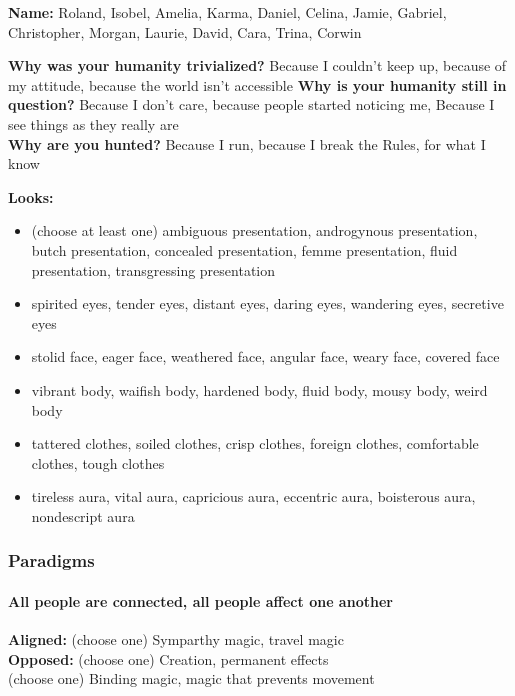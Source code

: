 \documentclass[
]{article}
\providecommand{\tightlist}{%
  \setlength{\itemsep}{0pt}\setlength{\parskip}{0pt}}
\begin{document}
\textbf{Name:} Roland, Isobel, Amelia, Karma, Daniel, Celina, Jamie,
Gabriel, Christopher, Morgan, Laurie, David, Cara, Trina, Corwin

\textbf{Why was your humanity trivialized?} Because I couldn't keep up,
because of my attitude, because the world isn't accessible \textbf{Why
is your humanity still in question?} Because I don't care, because
people started noticing me, Because I see things as they really are\\
\textbf{Why are you hunted?} Because I run, because I break the Rules,
for what I know

\textbf{Looks:}

\begin{itemize}
\tightlist
\item
  (choose at least one) ambiguous presentation, androgynous
  presentation, butch presentation, concealed presentation, femme
  presentation, fluid presentation, transgressing presentation
\item
  spirited eyes, tender eyes, distant eyes, daring eyes, wandering eyes,
  secretive eyes
\item
  stolid face, eager face, weathered face, angular face, weary face,
  covered face
\item
  vibrant body, waifish body, hardened body, fluid body, mousy body,
  weird body
\item
  tattered clothes, soiled clothes, crisp clothes, foreign clothes,
  comfortable clothes, tough clothes
\item
  tireless aura, vital aura, capricious aura, eccentric aura, boisterous
  aura, nondescript aura
\end{itemize}

\hypertarget{paradigms-8}{%
\subsubsection{Paradigms}\label{paradigms-8}}

\hypertarget{all-people-are-connected-all-people-affect-one-another}{%
\paragraph{All people are connected, all people affect one
another}\label{all-people-are-connected-all-people-affect-one-another}}

\textbf{Aligned:} (choose one) Symparthy magic, travel magic\\
\textbf{Opposed:} (choose one) Creation, permanent effects\\
(choose one) Binding magic, magic that prevents movement
\end{document}
